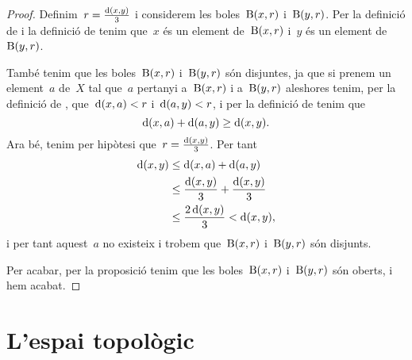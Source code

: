 \documentclass[../topologia.tex]{subfiles}
\begin{document}
    \begin{proof}
        Definim~\(r=\frac{\operatorname{d}(x,y)}{3}\) i considerem les boles~\(\operatorname{B}(x,r)\) i~\(\operatorname{B}(y,r)\).
        Per la definició de  i la definició de  tenim que~\(x\) és un element de~\(\operatorname{B}(x,r)\) i~\(y\) és un element de~\(\operatorname{B}(y,r)\).

        També tenim que les boles~\(\operatorname{B}(x,r)\) i~\(\operatorname{B}(y,r)\) són disjuntes, ja que si prenem un element~\(a\) de~\(X\) tal que~\(a\) pertanyi a~\(\operatorname{B}(x,r)\) i a~\(\operatorname{B}(y,r)\) aleshores tenim, per la definició de , que~\(\operatorname{d}(x,a)<r\) i~\(\operatorname{d}(a,y)<r\), i per la definició de  tenim que
        \[
            \operatorname{d}(x,a)+\operatorname{d}(a,y)\geq \operatorname{d}(x,y).
        \]
        Ara bé, tenim per hipòtesi que~\(r=\frac{\operatorname{d}(x,y)}{3}\).
        Per tant
        \begin{align*}
            \operatorname{d}(x,y) &\leq \operatorname{d}(x,a)+\operatorname{d}(a,y) \\
            &\leq \frac{\operatorname{d}(x,y)}{3} + \frac{\operatorname{d}(x,y)}{3} \\
            &\leq \frac{2\operatorname{d}(x,y)}{3} < \operatorname{d}(x,y),
        \end{align*}
        i per tant aquest~\(a\) no existeix i trobem que~\(\operatorname{B}(x,r)\) i~\(\operatorname{B}(y,r)\) són disjunts.

        Per acabar, per la proposició  tenim que les boles~\(\operatorname{B}(x,r)\) i~\(\operatorname{B}(y,r)\) són oberts, i hem acabat.
    \end{proof}
\section{L'espai topològic}
\end{document}
